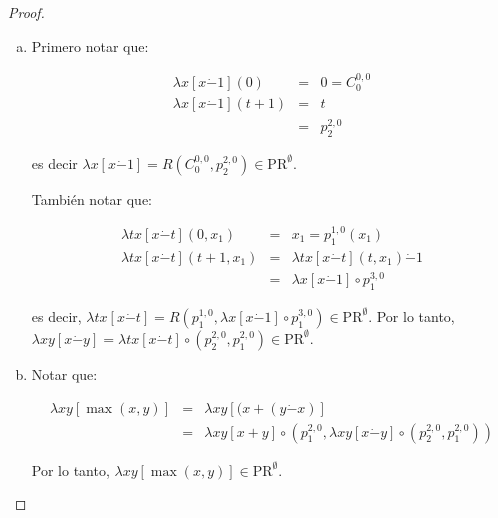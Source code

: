   \begin{proof}
    \begin{enumerate}[a)]
      \item Primero notar que:

        \begin{eqnarray}
          \nonumber \lambda x \left[x \dot{-}1\right](0) &=& 0 = C_{0}^{0,0} \\
          \nonumber \lambda x \left[x \dot{-}1\right](t+1) &=& t \\
          \nonumber &=& p_{2}^{2,0}
        \end{eqnarray}

        \par es decir $\lambda x \left[x \dot{-}1\right] = R(C_{0}^{0,0}, p_{2}^{2,0}) \in \mathrm{PR}^{\emptyset}$.
        \par También notar que:

        \begin{eqnarray}
          \nonumber \lambda tx \left[x \dot{-}t\right](0, x_{1}) &=& x_{1} = p_{1}^{1,0}(x_{1}) \\
          \nonumber \lambda tx \left[x \dot{-}t\right](t+1, x_{1}) &=& \lambda tx \left[x \dot{-}t\right](t, x_{1})
            \dot{-} 1\\
          \nonumber &=& \lambda x \left[x \dot{-}1\right] \circ p_{1}^{3,0}
        \end{eqnarray}

        \par es decir, $\lambda tx \left[x \dot{-}t\right] = R(p_{1}^{1, 0}, \lambda x \left[x \dot{-}1\right] \circ
        p_{1}^{3, 0}) \in \mathrm{PR}^{\emptyset}$. Por lo tanto, $\lambda xy \left[x \dot{-}y\right] = \lambda tx
        \left[x \dot{-}t\right] \circ (p_{2}^{2, 0}, p_{1}^{2, 0}) \in \mathrm{PR}^{\emptyset}$.

      \item Notar que:

        \begin{eqnarray}
          \nonumber \lambda xy \left[\max (x,y)\right] &=& \lambda xy \left[(x + (y \dot{-}x)\right] \\
          \nonumber &=& \lambda xy \left[x+y\right] \circ \left(p_{1}^{2,0}, \lambda xy \left[x \dot{-}y\right] \circ
            (p_{2}^{2,0}, p_{1}^{2,0})\right)
        \end{eqnarray}

        \par Por lo tanto, $\lambda xy \left[\max (x,y)\right] \in \mathrm{PR}^{\emptyset}$.


\end{enumerate}
\end{proof}
